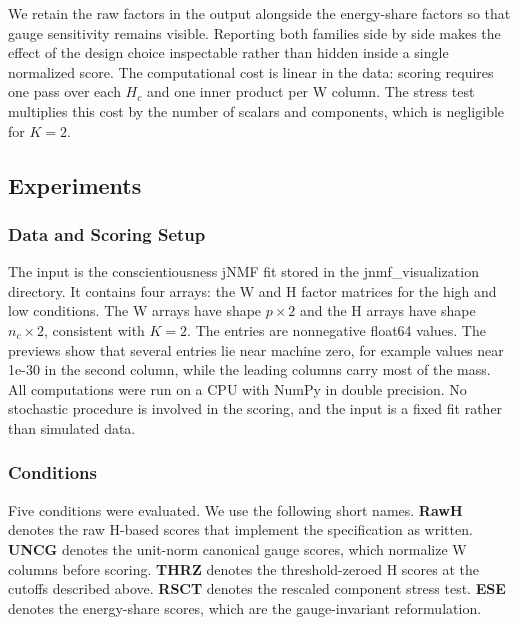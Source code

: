 \documentclass{article}
\begin{document}
\label{sec:design_rationale_and_cost}

We retain the raw factors in the output alongside the energy-share factors so that gauge sensitivity remains visible. Reporting both families side by side makes the effect of the design choice inspectable rather than hidden inside a single normalized score. The computational cost is linear in the data: scoring requires one pass over each $H_c$ and one inner product per W column. The stress test multiplies this cost by the number of scalars and components, which is negligible for $K = 2$.

\subsection{Experiments}

\label{sec:experiments}

\subsubsection{Data and Scoring Setup}

\label{sec:data_and_scoring_setup}

The input is the conscientiousness jNMF fit stored in the jnmf\_visualization directory. It contains four arrays: the W and H factor matrices for the high and low conditions. The W arrays have shape $p \times 2$ and the H arrays have shape $n_c \times 2$, consistent with $K = 2$. The entries are nonnegative float64 values. The previews show that several entries lie near machine zero, for example values near 1e-30 in the second column, while the leading columns carry most of the mass. All computations were run on a CPU with NumPy in double precision. No stochastic procedure is involved in the scoring, and the input is a fixed fit rather than simulated data.

\subsubsection{Conditions}

\label{sec:conditions}

Five conditions were evaluated. We use the following short names. \textbf{RawH} denotes the raw H-based scores that implement the specification as written. \textbf{UNCG} denotes the unit-norm canonical gauge scores, which normalize W columns before scoring. \textbf{THRZ} denotes the threshold-zeroed H scores at the cutoffs described above. \textbf{RSCT} denotes the rescaled component stress test. \textbf{ESE} denotes the energy-share scores, which are the gauge-invariant reformulation.
\end{document}
